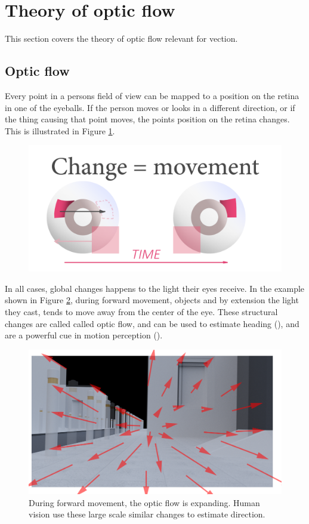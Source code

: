 \documentclass[11pt,a4paper,oneside,table,xcdraw]{article}
\begin{document}
\section{Theory of optic flow}
This section covers the theory of optic flow relevant for vection.
\subsection{Optic flow}
Every point in a persons field of view can be mapped to a position on the retina in one of the eyeballs. If the person moves or looks in a different direction, or if the thing causing that point moves, the points position on the retina changes. This is illustrated in Figure \ref{fig:eye}.
\begin{figure}[H]
		\centering
		\includegraphics[width=0.8\linewidth]{figure/eyes.png}
		\caption{}
		\label{fig:eye}
\end{figure}
In all cases, global changes happens to the light their eyes receive. In the example shown in Figure \ref{fig:opticalflow}, during forward movement, objects and by extension the light they cast, tends to move away from the center of the eye. These structural changes are called called optic flow, and can be used to estimate heading (\cite{opticflowheading}), and are a powerful cue in motion perception (\cite{opticalflow}).
\begin{figure}[H]
		\centering
		\includegraphics[width=0.8\linewidth]{figure/opticalflow.png}
		\caption{During forward movement, the optic flow is expanding. Human vision use these large scale similar changes to estimate direction.}
		\label{fig:opticalflow}
\end{figure}
\end{document}
